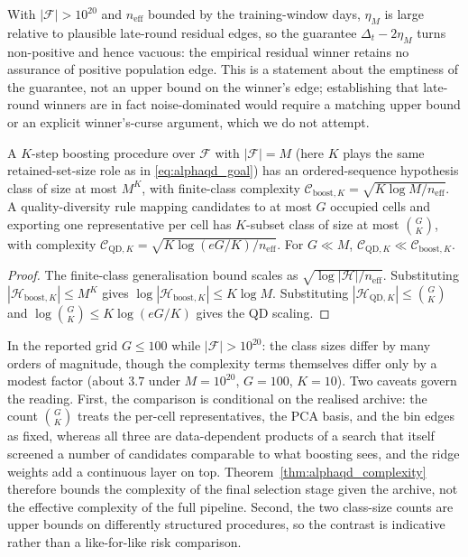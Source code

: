 With $|\mathcal{F}|>10^{20}$ and $n_{\mathrm{eff}}$ bounded by the training-window days, $\eta_M$ is large relative to plausible late-round residual edges, so the guarantee $\Delta_t-2\eta_M$ turns non-positive and hence vacuous: the empirical residual winner retains no assurance of positive population edge. This is a statement about the emptiness of the guarantee, not an upper bound on the winner's edge; establishing that late-round winners are in fact noise-dominated would require a matching upper bound or an explicit winner's-curse argument, which we do not attempt.

\begin{theorem}
\label{thm:alphaqd_complexity}
A $K$-step boosting procedure over $\mathcal{F}$ with $|\mathcal{F}|=M$ (here $K$ plays the same retained-set-size role as in \eqref{eq:alphaqd_goal}) has an ordered-sequence hypothesis class of size at most $M^K$, with finite-class complexity $\mathcal{C}_{\mathrm{boost},K}=\sqrt{K\log M/n_{\mathrm{eff}}}$. A quality-diversity rule mapping candidates to at most $G$ occupied cells and exporting one representative per cell has $K$-subset class of size at most $\binom{G}{K}$, with complexity $\mathcal{C}_{\mathrm{QD},K}=\sqrt{K\log(eG/K)/n_{\mathrm{eff}}}$. For $G\ll M$, $\mathcal{C}_{\mathrm{QD},K}\ll\mathcal{C}_{\mathrm{boost},K}$.
\end{theorem}
\begin{proof}
The finite-class generalisation bound scales as $\sqrt{\log|\mathcal{H}|/n_{\mathrm{eff}}}$. Substituting $|\mathcal{H}_{\mathrm{boost},K}|\le M^K$ gives $\log|\mathcal{H}_{\mathrm{boost},K}|\le K\log M$. Substituting $|\mathcal{H}_{\mathrm{QD},K}|\le\binom{G}{K}$ and $\log\binom{G}{K}\le K\log(eG/K)$ gives the QD scaling.
\end{proof}

In the reported grid $G\le 100$ while $|\mathcal{F}|>10^{20}$: the class sizes differ by many orders of magnitude, though the complexity terms themselves differ only by a modest factor (about $3.7$ under $M=10^{20}$, $G=100$, $K=10$). Two caveats govern the reading. First, the comparison is conditional on the realised archive: the count $\binom{G}{K}$ treats the per-cell representatives, the PCA basis, and the bin edges as fixed, whereas all three are data-dependent products of a search that itself screened a number of candidates comparable to what boosting sees, and the ridge weights add a continuous layer on top. Theorem~\ref{thm:alphaqd_complexity} therefore bounds the complexity of the final selection stage given the archive, not the effective complexity of the full pipeline. Second, the two class-size counts are upper bounds on differently structured procedures, so the contrast is indicative rather than a like-for-like risk comparison.

